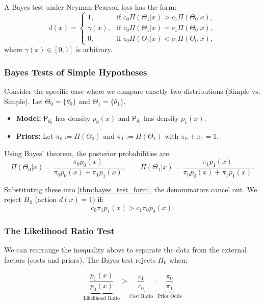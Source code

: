 \begin{theo}
\label{thm:bayes_test_form}
A Bayes test under Neyman-Pearson loss has the form:
\[
d(x) = \begin{cases} 
1, & \text{if } c_0 \Pi(\Theta_1|x) > c_1 \Pi(\Theta_0|x), \\ 
\gamma(x), & \text{if } c_0 \Pi(\Theta_1|x) = c_1 \Pi(\Theta_0|x), \\ 
0, & \text{if } c_0 \Pi(\Theta_1|x) < c_1 \Pi(\Theta_0|x), 
\end{cases}
\]
where $\gamma(x) \in [0,1]$ is arbitrary.
\end{theo}

\subsubsection{Bayes Tests of Simple Hypotheses}
Consider the specific case where we compare exactly two distributions (Simple vs. Simple).
Let $\Theta_0 = \{\theta_0\}$ and $\Theta_1 = \{\theta_1\}$.
\begin{itemize}
    \item \textbf{Model:} $\mathsf{P}_{\theta_0}$ has density $p_0(x)$ and $\mathsf{P}_{\theta_1}$ has density $p_1(x)$.
    \item \textbf{Priors:} Let $\pi_0 := \Pi(\Theta_0)$ and $\pi_1 := \Pi(\Theta_1)$ with $\pi_0 + \pi_1 = 1$.
\end{itemize}

Using Bayes' theorem, the posterior probabilities are:
\[
\Pi(\Theta_0|x) = \frac{\pi_0 p_0(x)}{\pi_0 p_0(x) + \pi_1 p_1(x)}, \qquad \Pi(\Theta_1|x) = \frac{\pi_1 p_1(x)}{\pi_0 p_0(x) + \pi_1 p_1(x)}.
\]

Substituting these into \autoref{thm:bayes_test_form}, the denominators cancel out. We reject $H_0$ (action $d(x)=1$) if:
\[ c_0 \pi_1 p_1(x) > c_1 \pi_0 p_0(x). \]

\subsubsection{The Likelihood Ratio Test}
We can rearrange the inequality above to separate the data from the external factors (costs and priors). The Bayes test rejects $H_0$ when:

\[
\underbrace{\frac{p_1(x)}{p_0(x)}}_{\text{Likelihood Ratio}} > \underbrace{\frac{c_1}{c_0}}_{\text{Cost Ratio}} \cdot \underbrace{\frac{\pi_0}{\pi_1}}_{\text{Prior Odds}}
\]



